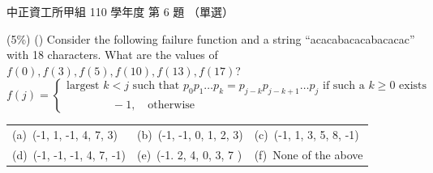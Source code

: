 \begin{pastexam}[label={px:ccu-110-swa-04}]{中正資工所甲組 110 學年度 第 6 題}
（單選）

(5\%) (\quad) Consider the following failure function and a string ``acacabacacabacacac'' with
18 characters. What are the values of $f(0), f(3), f(5), f(10), f(13), f(17)$?
\[
f(j)=\begin{cases}
\text{largest } k<j \text{ such that } p_0p_1\ldots p_k=p_{j-k}p_{j-k+1}\ldots p_j \text{ if such a } k\ge 0 \text{ exists}\\
\qquad\qquad -1,\quad \text{otherwise}
\end{cases}
\]

\begin{tabular}{@{}lll@{}}
(a)~(-1, 1, -1, 4, 7, 3) & (b)~(-1, -1, 0, 1, 2, 3) & (c)~(-1, 1, 3, 5, 8, -1) \\
(d)~(-1, -1, -1, 4, 7, -1) & (e)~(-1. 2, 4, 0, 3, 7 ) & (f)~None of the above
\end{tabular}
\end{pastexam}

